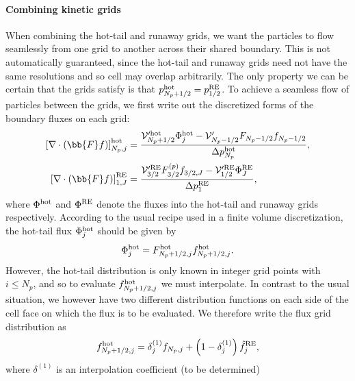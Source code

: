 \documentclass{notes}
\newcommand{\Vp}{\mathcal{V}'}
\begin{document}
    \paragraph{Combining kinetic grids}
    When combining the hot-tail and runaway grids, we want the particles to flow
    seamlessly from one grid to another across their shared boundary. This is
    not automatically guaranteed, since the hot-tail and runaway grids need not
    have the same resolutions and so cell may overlap arbitrarily. The only
    property we can be certain that the grids satisfy is that
    $p_{N_p+1/2}^{\rm hot} = p_{1/2}^{\rm RE}$. To achieve a seamless flow of
    particles between the grids, we first write out the discretized forms of the
    boundary fluxes on each grid:
    \begin{equation}\label{eq:crossCondition}
        \begin{aligned}
            \left[ \nabla\cdot\left( \bb{F}f \right)\right]^{\rm hot}_{N_p,j} &=
                \frac{\Vp^{\rm hot}_{N_p+1/2}\Phi^{\rm hot}_j - \Vp_{N_p-1/2} F_{N_p-1/2}f_{N_p-1/2}}{\Delta p^{\rm hot}_{N_p}},\\
            \left[ \nabla\cdot\left( \bb{F}f \right)\right]^{\rm RE}_{1,J} &=
                \frac{\Vp^{\rm RE}_{3/2} F^{(p)}_{3/2} f_{3/2,J} - \Vp^{\rm RE}_{1/2}\Phi^{\rm RE}_J}{\Delta p^{\rm RE}_1},
        \end{aligned}
    \end{equation}
    where $\Phi^{\rm hot}$ and $\Phi^{\rm RE}$ denote the fluxes into the
    hot-tail and runaway grids respectively. According to the usual recipe used
    in a finite volume discretization, the hot-tail flux $\Phi^{\rm hot}_j$
    should be given by
    \begin{equation}
        \Phi^{\rm hot}_j = F_{N_p+1/2,j}^{\rm hot} f_{N_p+1/2,j}^{\rm hot}.
    \end{equation}
    However, the hot-tail distribution is only known in integer grid points with
    $i\leq N_p$, and so to evaluate $f_{N_p+1/2,j}^{\rm hot}$ we must
    interpolate. In contrast to the usual situation, we however have two
    different distribution functions on each side of the cell face on which the
    flux is to be evaluated. We therefore write the flux grid distribution as
    \begin{equation}
        f_{N_p+1/2,j}^{\rm hot} = \delta^{(1)}_{j}f_{N_p,j} +
            \left( 1-\delta^{(1)}_{j} \right) \hat{f}^{\rm RE}_j,
    \end{equation}
    where $\delta^{(1)}$ is an interpolation coefficient (to be determined)
\end{document}
